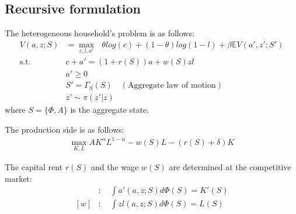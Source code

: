 \subsection*{Recursive formulation}
The heterogeneous household's problem is as follows:
\begin{align*}
  V(a,z;S) &= \max_{c,l,a'}\text{ } \theta log(c) + (1-\theta)log(1-l)+ \beta \mathbb{E}V(a',z';S')
  \\
  \text{s.t.}\quad& c + a' = (1+r(S))a + w(S)zl
  \\
  & a'\geq 0
  \\
  & S' = \Gamma_{S}(S) \quad(\text{Aggregate law of motion})
  \\
  & z' \sim \pi(z'|z)
\end{align*}
where $S = \{\Phi,A\}$ is the aggregate state.

The production side is as follows:
\begin{align*}
  \max_{K,L} A K^{\alpha}L^{1-\alpha} - w(S)L - (r(S)+\delta)K
\end{align*}

The capital rent $r(S)$ and the wage $w(S)$ are determined at the competitive market:
\begin{align*}
  [r]&:\quad \int a'(a,z;S)d\Phi(S) = K'(S)
  \\
  [w]&:\quad \int z l(a,z;S) d\Phi(S) = L(S)
\end{align*}
